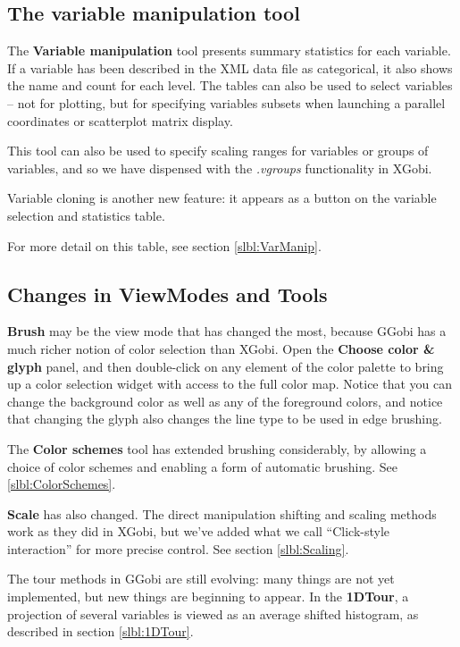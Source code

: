 \documentclass[11pt]{article}
\begin{document}
\subsection {The variable manipulation tool}

The {\bf Variable manipulation} tool presents summary statistics for
each variable.  If a variable has been described in the XML data file
as categorical, it also shows the name and count for each level.
The tables can also be used to select variables -- not for plotting, but
for specifying variables subsets when launching a parallel coordinates
or scatterplot matrix display.

This tool can also be used to specify scaling ranges for variables or
groups of variables, and so we have dispensed with the {\em .vgroups}
functionality in XGobi.

Variable cloning is another new feature: it appears as a button
on the variable selection and statistics table.

For more detail on this table, see section \ref{slbl:VarManip}.

\subsection{Changes in ViewModes and Tools}

{\bf Brush} may be the view mode that has changed the most,
because GGobi has a much richer notion of color selection than
XGobi.  Open the {\bf Choose color \& glyph} panel, and then
double-click on any element of the color palette to bring up a color
selection widget with access to the full color map.  Notice that you
can change the background color as well as any of the foreground
colors, and notice that changing the glyph also changes the line
type to be used in edge brushing.

The {\bf Color schemes} tool has extended brushing considerably,
by allowing a choice of color schemes and enabling a form of
automatic brushing.  See \ref{slbl:ColorSchemes}.

{\bf Scale} has also changed.  The direct manipulation shifting and
scaling methods work as they did in XGobi, but we've added what we
call ``Click-style interaction'' for more precise control.  See section
\ref{slbl:Scaling}.

The tour methods in GGobi are still evolving: many things are not yet
implemented, but new things are beginning to appear.  In the {\bf
1DTour}, a projection of several variables is viewed as an average
shifted histogram, as described in section \ref{slbl:1DTour}.
\end{document}
